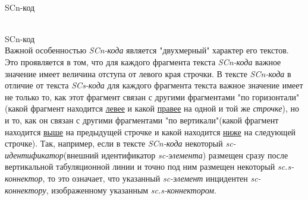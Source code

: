 \begin{frame}{\\SCn-код}
	\topline
	\justifying
	\vspace*{\fill}\\
	\small{
		\begin{SCn}
			
		\end{SCn}
	}
\end{frame}

\begin{frame}{\\SCn-код}
	\topline
	\justifying
	\vspace*{\fill}\\
	Важной особенностью \textit{SCn-кода} является "двухмерный" характер его текстов. Это проявляется в
	том, что для каждого фрагмента текста \textit{SCn-кода} важное значение имеет величина отступа от левого
	края строчки.
	В тексте \textit{SCn-кода} в отличие от текста \textit{SCs-кода} для каждого фрагмента текста важное значение имеет не только то, как этот фрагмент связан с другими фрагментами "по горизонтали"(какой
	фрагмент находится \underline{левее} и какой \underline{правее} на одной и той же \textit{строчке}), но и то, как он связан с другими фрагментами "по вертикали"(какой фрагмент находится \underline{выше} на предыдущей строчке и какой находится \underline{ниже} на следующей строчке). Так, например, если в тексте \textit{SCn-кода} некоторый \textit{sc-идентификатор}(внешний идентификатор \textit{sc-элемента}) размещен сразу после вертикальной табуляционной линии и точно под ним размещен некоторый \textit{sc.s-коннектор}, то это означает, что указанный \textit{sc-элемент} инцидентен \textit{sc-коннектору}, изображенному указанным \textit{sc.s-коннектором}.
\end{frame}

